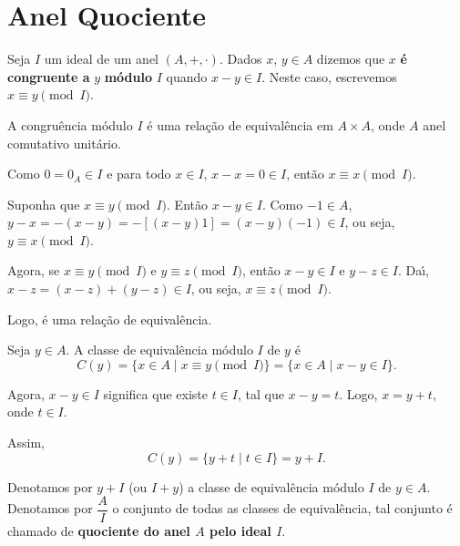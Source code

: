 \section{Anel Quociente} %
\label{sec:anel_quociente}

\begin{definicao}
    Seja $I$ um ideal de um anel $(A, +, \cdot)$. Dados $x$, $y \in A$ dizemos que $x$ \textbf{\'e congruente a} $y$ \textbf{m\'odulo} $I$ quando $x-y \in I$. Neste caso,
    escrevemos $x\equiv y \pmod I$.
\end{definicao}

\begin{proposicao}
    A congru{\^e}ncia m{\'o}dulo $I$ {\'e} uma rela{\c c}{\~a}o de equival{\^e}ncia em $A \times A$, onde $A$ anel comutativo unit{\'a}rio.
\end{proposicao}
\begin{prova}
    Como $0 = 0_{A} \in I$ e para todo $x \in I$, $x - x = 0 \in I$, ent{\~a}o $x \equiv x \pmod I$.

    Suponha que $x\equiv y \pmod I$. Ent{\~a}o $x - y \in I$. Como $-1 \in A$, $y - x = -(x - y) = -[(x - y)1] = (x - y)(-1) \in I$, ou seja, $y\equiv x \pmod I$.

    Agora, se $x\equiv y \pmod I$ e $y\equiv z \pmod I$, ent{\~a}o $x - y \in I$ e $y - z \in I$. Da{\'\i}, $x - z = (x - z) + (y - z)\in I$, ou seja, $x\equiv z \pmod I$.

    Logo, {\'e} uma rela{\c c}{\~a}o de equival{\^e}ncia.
\end{prova}

Seja $y \in A$. A classe de equival{\^e}ncia m{\'o}dulo $I$ de $y$ {\'e}
\[
    C(y) = \{x \in A \mid x\equiv y \pmod I\} = \{x \in A \mid x - y \in I\}.
\]

Agora, $x - y \in I$ significa que existe $t \in I$, tal que $x - y = t$. Logo, $x = y + t$, onde $t \in I$.

Assim,
\[
    C(y) = \{y + t\mid t \in I\} = y + I.
\]

\begin{observacao}
    Denotamos por $y + I$ (ou $I + y$) a classe de equival{\^e}ncia m{\'o}dulo $I$ de $y \in A$. Denotamos por $\dfrac{A}{I}$ o conjunto de todas as classes de equival{\^e}ncia,
    tal conjunto {\'e} chamado de \textbf{quociente do anel $A$ pelo ideal $I$}.
\end{observacao}

